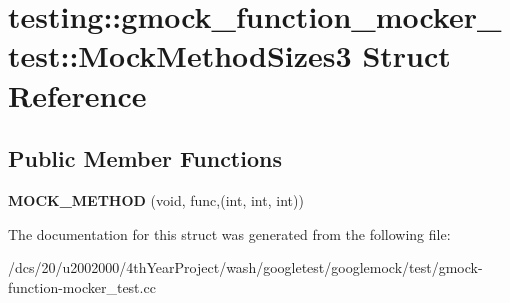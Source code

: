 \hypertarget{structtesting_1_1gmock__function__mocker__test_1_1MockMethodSizes3}{}\section{testing\+:\+:gmock\+\_\+function\+\_\+mocker\+\_\+test\+:\+:Mock\+Method\+Sizes3 Struct Reference}
\label{structtesting_1_1gmock__function__mocker__test_1_1MockMethodSizes3}
\subsection*{Public Member Functions}
\begin{DoxyCompactItemize}
\item 
\mbox{\label{structtesting_1_1gmock__function__mocker__test_1_1MockMethodSizes3_ad85fc73275d13ba9b6ced01e5ef832cc}} 
{\bfseries M\+O\+C\+K\+\_\+\+M\+E\+T\+H\+OD} (void, func,(int, int, int))
\end{DoxyCompactItemize}


The documentation for this struct was generated from the following file\+:\begin{DoxyCompactItemize}
\item 
/dcs/20/u2002000/4th\+Year\+Project/wash/googletest/googlemock/test/gmock-\/function-\/mocker\+\_\+test.\+cc\end{DoxyCompactItemize}

